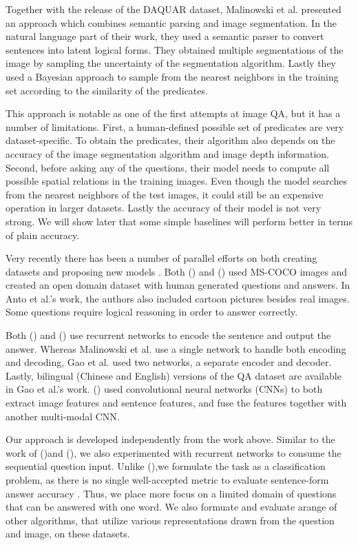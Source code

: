 \documentclass{article}
\renewcommand{\*}[1]{\textbf{#1}}
\newcommand{\shortcite}[1]{\citeauthor{#1} (\citeyear{#1})}
\begin{document}
Together with the release of the DAQUAR dataset, Malinowski et al. presented 
an approach which combines semantic parsing and image segmentation. In the 
natural language part of their work, they used a semantic parser \cite{liang13} 
to convert sentences into latent logical forms. They obtained multiple 
segmentations of the image by sampling the uncertainty of the segmentation 
algorithm. Lastly they used a Bayesian approach to sample from the nearest 
neighbors in the training set according to the similarity of the predicates.

This approach is notable as one of the first attempts at image QA, but it has a 
number of limitations. First, a human-defined possible set of predicates are 
very dataset-specific. To obtain the predicates, their algorithm also depends 
on the accuracy of the image segmentation algorithm and image depth 
information. Second, before asking any of the questions, their model needs to 
compute all possible spatial relations in the training images. Even though the 
model searches from the nearest neighbors of the test images, it could still be 
an expensive operation in larger datasets. Lastly the accuracy of their model 
is not very strong. We will show later that some simple baselines will perform 
better in terms of plain accuracy.

Very recently there has been a number of parallel efforts on both 
creating datasets and proposing new models \cite{antol14, malinowski15, gao15, 
ma15}. Both \shortcite{antol14} and \shortcite{gao15} used MS-COCO 
\cite{mscoco} images and created an open domain dataset with human generated 
questions and answers. In Anto et al.'s work, the authors also included cartoon 
pictures besides real images. Some questions require logical reasoning in order 
to answer correctly.

Both \shortcite{malinowski15} and \shortcite{gao15} use recurrent networks to 
encode the sentence and output the answer. Whereas Malinowski et al. use a 
single network to handle both encoding and decoding, Gao et al. used two 
networks, a separate encoder and decoder. Lastly, bilingual (Chinese and 
English) versions of the QA dataset are available in Gao et al.'s work. 
\shortcite{ma15} used convolutional neural networks (CNNs) to both extract 
image features and sentence features, and fuse the features together with 
another multi-modal CNN. 

Our approach is developed independently from the work above. Similar to the 
work of \shortcite{malinowski15}and \shortcite{gao15}, we also experimented 
with recurrent networks to consume the sequential question input. Unlike 
\shortcite{gao15},we formulate the task as a classification problem, as there 
is no single well-accepted metric to evaluate sentence-form answer accuracy 
\cite{chen15}. Thus, we place more focus on a limited domain of questions that 
can be answered with one word. We also formuate and evaluate arange of other 
algorithms, that utilize various representations drawn from the question and 
image, on these datasets.
\end{document}
